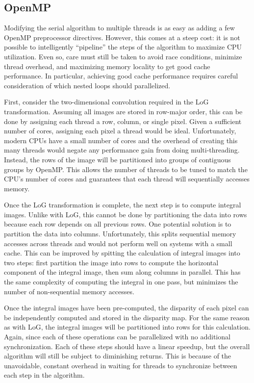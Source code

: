\documentclass{article}
\begin{document}
\subsection{OpenMP}
\label{sec:parallel-omp}
Modifying the serial algorithm to multiple threads is as easy as adding a few
OpenMP preprocessor directives. However, this comes at a steep cost: it is not
possible to intelligently ``pipeline'' the steps of the algorithm to maximize
CPU utilization. Even so, care must still be taken to avoid race conditions,
minimize thread overhead, and maximizing memory locality to get good cache
performance. In particular, achieving good cache performance requires careful
consideration of which nested loops should parallelized. 

First, consider the two-dimensional convolution required in the LoG
transformation. Assuming all images are stored in row-major order, this can be
done by assigning each thread a row, column, or single pixel. Given a
sufficient number of cores, assigning each pixel a thread would be ideal.
Unfortunately, modern CPUs have a small number of cores and the overhead of
creating this many threads would negate any performance gain from doing
multi-threading. Instead, the rows of the image will be partitioned into groups
of contiguous groups by OpenMP. This allows the number of threads to be tuned
to match the CPU's number of cores and guarantees that each thread will
sequentially accesses memory.

Once the LoG transformation is complete, the next step is to compute integral
images. Unlike with LoG, this cannot be done by partitioning the data into rows
because each row depends on all previous rows. One potential solution is to
partition the data into columns. Unfortunately, this splits sequential memory
accesses across threads and would not perform well on systems with a small
cache. This can be improved by spitting the calculation of integral images into
two steps: first partition the image into rows to compute the horizontal
component of the integral image, then sum along columns in parallel. This has
the same complexity of computing the integral in one pass, but minimizes the
number of non-sequential memory accesses.

Once the integral images have been pre-computed, the disparity of each pixel
can be independently computed and stored in the disparity map. For the same
reason as with LoG, the integral images will be partitioned into rows for this
calculation. Again, since each of these operations can be parallelized with no
additional synchronization. Each of these steps should have a linear speedup,
but the overall algorithm will still be subject to diminishing returns. This is
because of the unavoidable, constant overhead in waiting for threads to
synchronize between each step in the algorithm.
\end{document}
